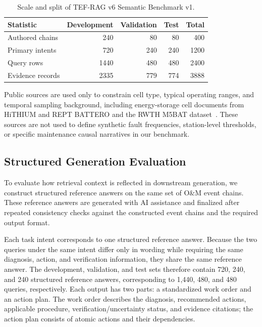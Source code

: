 \begin{table}[t]
\caption{Scale and split of TEF-RAG v6 Semantic Benchmark v1.}
\label{tab:dataset_stats}
\centering
\small
\begin{tabular}{lrrrr}
\toprule
Statistic & Development & Validation & Test & Total \\
\midrule
Authored chains & 240 & 80 & 80 & 400 \\
Primary intents & 720 & 240 & 240 & 1200 \\
Query rows & 1440 & 480 & 480 & 2400 \\
Evidence records & 2335 & 779 & 774 & 3888 \\
\bottomrule
\end{tabular}
\end{table}

Public sources are used only to constrain cell type, typical operating ranges, and temporal sampling background, including energy-storage cell documents from HiTHIUM and REPT BATTERO and the RWTH M5BAT dataset~\cite{hithium2023v11,hithium2024v33,rept2025,rwth2026m5bat}. These sources are not used to define synthetic fault frequencies, station-level thresholds, or specific maintenance causal narratives in our benchmark.

\subsection{Structured Generation Evaluation}

To evaluate how retrieval context is reflected in downstream generation, we construct structured reference answers on the same set of O\&M event chains. These reference answers are generated with AI assistance and finalized after repeated consistency checks against the constructed event chains and the required output format.

Each task intent corresponds to one structured reference answer. Because the two queries under the same intent differ only in wording while requiring the same diagnosis, action, and verification information, they share the same reference answer. The development, validation, and test sets therefore contain 720, 240, and 240 structured reference answers, corresponding to 1,440, 480, and 480 queries, respectively. Each output has two parts: a standardized work order and an action plan. The work order describes the diagnosis, recommended actions, applicable procedure, verification/uncertainty status, and evidence citations; the action plan consists of atomic actions and their dependencies.

